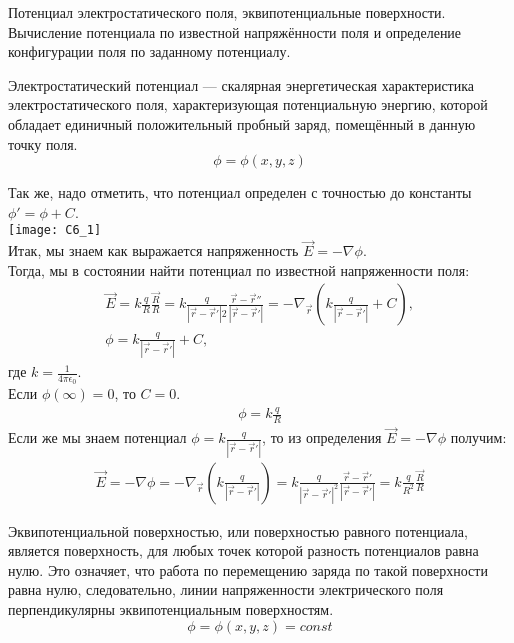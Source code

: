 \documentclass[__main__.tex]{subfiles}
\begin{document}
Потенциал электростатического поля, эквипотенциальные поверхности. Вычисление потенциала по известной напряжённости поля и определение конфигурации поля по заданному потенциалу.\\ 

\begin{definition}
Электростатический потенциал — скалярная энергетическая характеристика электростатического поля, характеризующая потенциальную энергию, которой обладает единичный положительный пробный заряд, помещённый в данную точку поля.$$\phi = \phi(x,y,z)$$
\end{definition}
Так же, надо отметить, что потенциал определен с точностью до константы $\phi ' = \phi + C$.\\
\texttt{[image: C6\_1]}\\
Итак, мы знаем как выражается напряженность $\vec{E} = -\nabla \phi$.\\
Тогда, мы в состоянии найти потенциал по известной напряженности поля:\\
\begin{gather}
\vec{E} = k\frac{q}{R}\frac{\vec{R}}{R} = k \frac{q}{|\vec{r}-\vec{r}'|2}\frac{\vec{r}-\vec{r}''}{|\vec{r}-\vec{r}'|} = -\nabla_{\vec{r}}\left(k\frac{q}{|\vec{r}-\vec{r}'|}+C\right),\\
\phi = k \frac{q}{|\vec{r}-\vec{r}'|}+C,
\end{gather}
где $k = \frac{1}{4 \pi \epsilon_0}$.\\
Если $\phi(\infty) = 0$, то $C = 0$.\\
\begin{gather}
\phi = k\frac{q}{R}
\end{gather}
Если же мы знаем потенциал $\phi = k \frac{q}{|\vec{r}-\vec{r}'|}$, то из определения $\vec{E} = - \nabla \phi$ получим:
\begin{gather}
\vec{E} = - \nabla \phi = - \nabla_{\vec{r}}\left(k \frac{q}{|\vec{r}-\vec{r}'|}\right) = k\frac{q}{|\vec{r}-\vec{r}'|^2}\frac{\vec{r}-\vec{r}'}{|\vec{r}-\vec{r}'|} = k\frac{q}{R^2}\frac{\vec{R}}{R}
\end{gather}
\begin{definition}
Эквипотенциальной поверхностью, или поверхностью равного потенциала, является поверхность, для любых точек которой разность потенциалов равна нулю. Это означяет, что работа по перемещению заряда по такой поверхности равна нулю, следовательно, линии напряженности электрического поля перпендикулярны эквипотенциальным поверхностям.$$\phi = \phi(x,y,z) = const$$
\end{definition}
\end{document}
